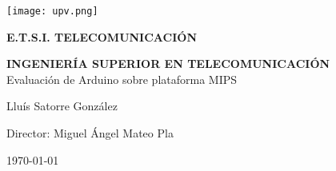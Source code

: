 

\begin{titlepage}

  \begin{center}

    \texttt{[image: upv.png]} \\
    
    \vspace{2.0cm}
    
    \LARGE{\textbf{E.T.S.I. TELECOMUNICACIÓN}} \\
    
    \vspace{1.0cm}
    
    \Large{\textbf{INGENIERÍA SUPERIOR EN TELECOMUNICACIÓN}} \\
    
    \vspace{3.0cm}
    \Large{Evaluación de Arduino sobre plataforma MIPS} \\
    
    \vspace{2.0cm}
    
    \Large{Lluís Satorre González} \\
    \vspace{0.5cm}
    
    \large{Director: Miguel Ángel Mateo Pla} \\
  
    \vspace{0.5cm}

    \large{\today}
    
  \end{center}
\end{titlepage}
